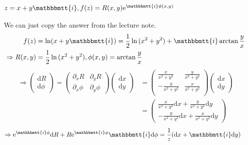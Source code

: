 \documentclass[]{ctexart}
\newcommand{\mi}{\mathbbmtt{i}}
\newcommand{\di}{\mathrm{d}}
\newcommand{\pa}{\partial}
\newcommand{\me}{\mathrm{e}}
\begin{document}
			\subsubsection{$z=x+y\mi, f(z)=R(x,y)\me ^{\mi \phi (x,y)}$}
			 We can just copy the answer from the lecture note. 
			\begin{equation*}
			\begin{aligned}
				f(z)&=\ln(x+y\mi)=\frac{1}{2}\ln{(x^2+y^2)}+\mi \arctan\frac{y}{x}\\
				\Rightarrow R(x,y)&=\frac{1}{2}\ln{(x^2+y^2)},\phi (x,y)=\arctan\frac{y}{x}
			\end{aligned}
			\end{equation*}
			\begin{equation*}
			\begin{aligned}
				\Rightarrow
				\begin{pmatrix}
					\di R\\
					\di \phi 
				\end{pmatrix}
				=
				\begin{pmatrix}
					\pa_xR & \pa_{y}R\\
					\pa_x\phi & \pa_{y}\phi
				\end{pmatrix}
				\begin{pmatrix}
					\di x\\
					\di y
				\end{pmatrix}
				&=
				\left(
				\begin{array}{cc}
					\frac{x}{x^2+y^2} & \frac{y}{x^2+y^2} \\
					-\frac{y}{x^2+y^2} & \frac{x}{x^2+y^2} \\
				\end{array}
				\right)
				\begin{pmatrix}
					\di x\\
					\di y
				\end{pmatrix}\\
				&=
				\begin{pmatrix}
					\frac{x}{x^2+y^2}\di x+ \frac{y}{x^2+y^2} \di y\\
					-\frac{y}{x^2+y^2} \di x+ \frac{x}{x^2+y^2}\di y
				\end{pmatrix}
			\end{aligned}
			\end{equation*}
			\begin{equation*}
			\begin{aligned}
				\Rightarrow \me ^{\mi \phi }\di R+R\me ^{\mi \phi}\mi \di \phi&=\frac{1}{z}(\di x+\mi \di y)
			\end{aligned}
			\end{equation*}
			
\end{document}
